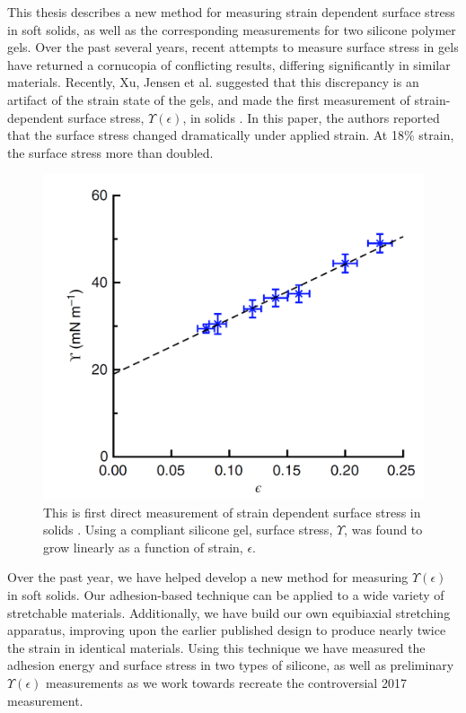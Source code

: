 This thesis describes a new method for measuring strain dependent surface stress in soft solids, as well as the corresponding measurements for two silicone polymer gels. Over the past several years, recent attempts to measure surface stress in gels have returned a cornucopia of conflicting results, differing significantly in similar materials. Recently, Xu, Jensen et al. suggested that this discrepancy is an artifact of the strain state of the gels, and made the first measurement of strain-dependent surface stress, $\Upsilon(\epsilon)$, in solids \cite{xu2017direct}. In this paper, the authors reported that the surface stress changed dramatically under applied strain. At 18\% strain, the surface stress more than doubled. 
\begin{figure}[h!]
	\centering
	\includegraphics[width=0.7\linewidth]{Chapters/Figures/2017natcomfig}
	\caption[Surface Stress vs. Strain in Silicone]{This is first direct measurement of strain dependent surface stress in solids \cite{xu2017direct}. Using a compliant silicone gel, surface stress, $\Upsilon$, was found to grow linearly as a function of strain, $ \epsilon $.}
	\label{fig:2017natcomfig}
\end{figure}

Over the past year, we have helped develop a new method for measuring $\Upsilon(\epsilon)$ in soft solids. Our adhesion-based technique can be applied to a wide variety of stretchable materials. Additionally, we have build our own equibiaxial stretching apparatus, improving upon the earlier published design \cite{xu2017direct} to produce nearly twice the strain in identical materials. Using this technique we have measured the adhesion energy and surface stress in two types of silicone, as well as preliminary $ \Upsilon(\epsilon) $ measurements as we work towards recreate the controversial 2017 measurement.

